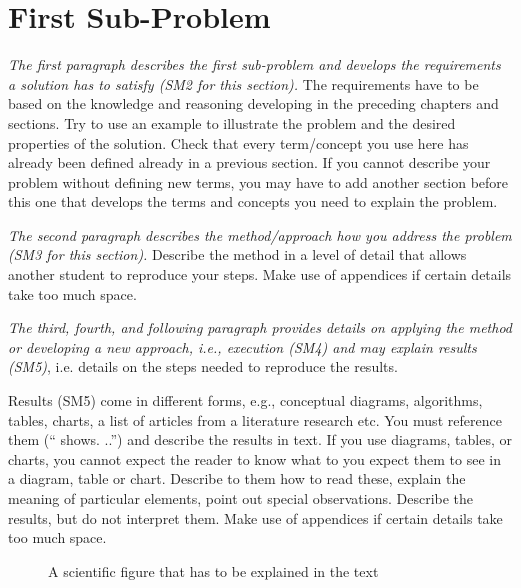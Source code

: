 \section{First Sub-Problem}\label{sec:problem1:subproblem1}

\emph{The first paragraph describes the first sub-problem and develops the requirements a solution has to satisfy (SM2 for this section).}
The requirements have to be based on the knowledge and reasoning developing in the preceding chapters and sections.
Try to use an example to illustrate the problem and the desired properties of the solution.
Check that every term/concept you use here has already been defined already in a previous section.
If you cannot describe your problem without defining new terms, you may have to add another section before this one that develops the terms and concepts you need to explain the problem.

\emph{The second paragraph describes the method/approach how you address the problem (SM3 for this section).}
Describe the method in a level of detail that allows another student to reproduce your steps.
Make use of appendices %
if certain details take too much space.

\emph{The third, fourth, and following paragraph provides details on applying the method or developing a new approach, i.e., execution (SM4) and may explain results (SM5)}, i.e. details on the steps needed to reproduce the results.

Results (SM5) come in different forms, e.g., conceptual diagrams, algorithms, tables, charts, a list of articles from a literature research etc. You must reference them (`` shows.
..'') and describe the results in text.
If you use diagrams, tables, or charts, you cannot expect the reader to know what to you expect them to see in a diagram, table or chart.
Describe to them how to read these, explain the meaning of particular elements, point out special observations.
Describe the results, but do not interpret them.
Make use of appendices if certain details take too much space.

\begin{figure}
  \centering
  \caption{A scientific figure that has to be explained in the text}
  \label{fig:my_label}
\end{figure}

